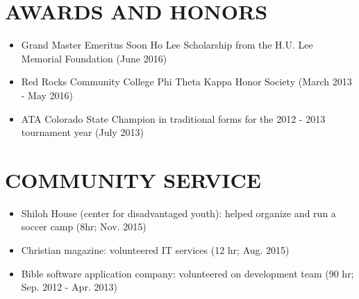 \documentclass[10.5pt,letterpaper]{article}
\begin{document}
\section*{AWARDS AND HONORS}
\begin{itemize}
    \item Grand Master Emeritus Soon Ho Lee Scholarship from the H.U. Lee Memorial Foundation (June
        2016)
    \item Red Rocks Community College Phi Theta Kappa Honor Society (March 2013 - May 2016)
    \item ATA Colorado State Champion in traditional forms for the 2012 - 2013 tournament year
        (July 2013)
\end{itemize}

\section*{COMMUNITY SERVICE}
\begin{itemize}
    \item Shiloh House (center for disadvantaged youth): helped organize and run a soccer camp (8hr;
        Nov. 2015)
    \item Christian magazine: volunteered IT services (12 hr; Aug. 2015)
    \item Bible software application company: volunteered on development team (90 hr; Sep.
        2012 - Apr. 2013)
\end{itemize}
\end{document}
